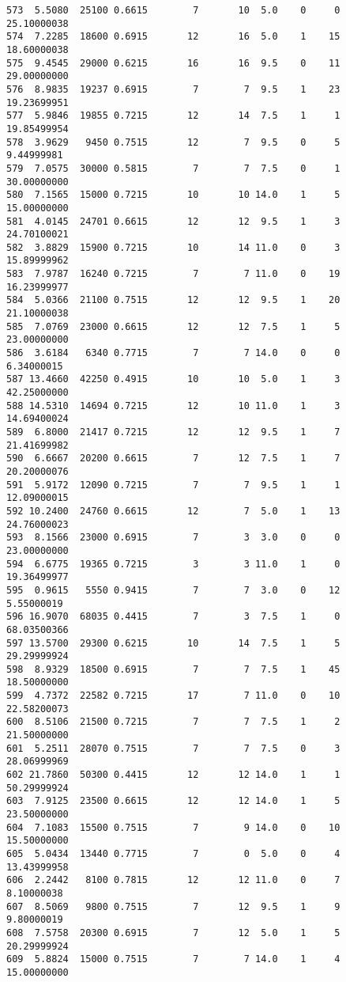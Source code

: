 \documentclass[
  letterpaper,
  DIV=11,
  numbers=noendperiod]{scrreprt}
\begin{document}
\begin{verbatim}
573  5.5080  25100 0.6615        7       10  5.0    0     0 25.10000038
574  7.2285  18600 0.6915       12       16  5.0    1    15 18.60000038
575  9.4545  29000 0.6215       16       16  9.5    0    11 29.00000000
576  8.9835  19237 0.6915        7        7  9.5    1    23 19.23699951
577  5.9846  19855 0.7215       12       14  7.5    1     1 19.85499954
578  3.9629   9450 0.7515       12        7  9.5    0     5  9.44999981
579  7.0575  30000 0.5815        7        7  7.5    0     1 30.00000000
580  7.1565  15000 0.7215       10       10 14.0    1     5 15.00000000
581  4.0145  24701 0.6615       12       12  9.5    1     3 24.70100021
582  3.8829  15900 0.7215       10       14 11.0    0     3 15.89999962
583  7.9787  16240 0.7215        7        7 11.0    0    19 16.23999977
584  5.0366  21100 0.7515       12       12  9.5    1    20 21.10000038
585  7.0769  23000 0.6615       12       12  7.5    1     5 23.00000000
586  3.6184   6340 0.7715        7        7 14.0    0     0  6.34000015
587 13.4660  42250 0.4915       10       10  5.0    1     3 42.25000000
588 14.5310  14694 0.7215       12       10 11.0    1     3 14.69400024
589  6.8000  21417 0.7215       12       12  9.5    1     7 21.41699982
590  6.6667  20200 0.6615        7       12  7.5    1     7 20.20000076
591  5.9172  12090 0.7215        7        7  9.5    1     1 12.09000015
592 10.2400  24760 0.6615       12        7  5.0    1    13 24.76000023
593  8.1566  23000 0.6915        7        3  3.0    0     0 23.00000000
594  6.6775  19365 0.7215        3        3 11.0    1     0 19.36499977
595  0.9615   5550 0.9415        7        7  3.0    0    12  5.55000019
596 16.9070  68035 0.4415        7        3  7.5    1     0 68.03500366
597 13.5700  29300 0.6215       10       14  7.5    1     5 29.29999924
598  8.9329  18500 0.6915        7        7  7.5    1    45 18.50000000
599  4.7372  22582 0.7215       17        7 11.0    0    10 22.58200073
600  8.5106  21500 0.7215        7        7  7.5    1     2 21.50000000
601  5.2511  28070 0.7515        7        7  7.5    0     3 28.06999969
602 21.7860  50300 0.4415       12       12 14.0    1     1 50.29999924
603  7.9125  23500 0.6615       12       12 14.0    1     5 23.50000000
604  7.1083  15500 0.7515        7        9 14.0    0    10 15.50000000
605  5.0434  13440 0.7715        7        0  5.0    0     4 13.43999958
606  2.2442   8100 0.7815       12       12 11.0    0     7  8.10000038
607  8.5069   9800 0.7515        7       12  9.5    1     9  9.80000019
608  7.5758  20300 0.6915        7       12  5.0    1     5 20.29999924
609  5.8824  15000 0.7515        7        7 14.0    1     4 15.00000000

\end{verbatim}
\end{document}
